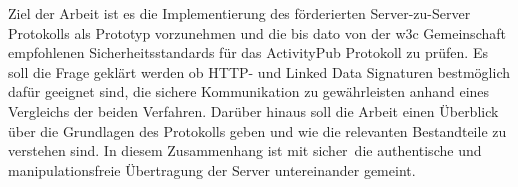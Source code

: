 {	%
	Ziel der Arbeit ist es die Implementierung des förderierten Server-zu-Server Protokolls als Prototyp vorzunehmen und die bis dato von der \gls{w3c} Gemeinschaft empfohlenen Sicherheitsstandards für das ActivityPub Protokoll zu prüfen. Es soll die Frage geklärt werden ob HTTP- und Linked Data Signaturen bestmöglich dafür geeignet sind, die sichere Kommunikation zu gewährleisten anhand eines Vergleichs der beiden Verfahren. Darüber hinaus soll die Arbeit einen Überblick über die Grundlagen des Protokolls geben und wie die relevanten Bestandteile zu verstehen sind. In diesem Zusammenhang ist mit \glqq sicher\grqq~die authentische und manipulationsfreie Übertragung der Server untereinander gemeint.\\
		
}

